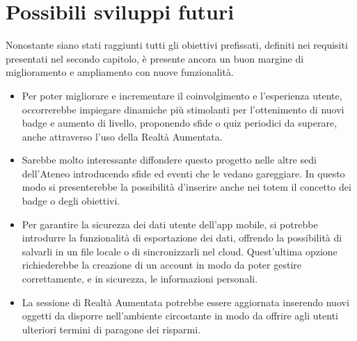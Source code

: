 \section*{Possibili sviluppi futuri}
Nonostante siano stati raggiunti tutti gli obiettivi prefissati, definiti nei requisiti presentati nel secondo capitolo, è presente ancora un buon margine di miglioramento e ampliamento con nuove funzionalità.
\begin{itemize}
    \itemsep1em
    \item Per poter migliorare e incrementare il coinvolgimento e l'esperienza utente, occorrerebbe impiegare dinamiche più stimolanti per l'ottenimento di nuovi badge e aumento di livello, proponendo sfide o quiz periodici da superare, anche attraverso l'uso della Realtà Aumentata.
    \item Sarebbe molto interessante diffondere questo progetto nelle altre sedi dell'Ateneo introducendo sfide ed eventi che le vedano gareggiare. In questo modo si presenterebbe la possibilità d'inserire anche nei totem il concetto dei badge o degli obiettivi.
    \item Per garantire la sicurezza dei dati utente dell'app mobile, si potrebbe introdurre la funzionalità di esportazione dei dati, offrendo la possibilità di salvarli in un file locale o di sincronizzarli nel cloud. Quest'ultima opzione richiederebbe la creazione di un account in modo da poter gestire correttamente, e in sicurezza, le informazioni personali.
    \item La sessione di Realtà Aumentata potrebbe essere aggiornata inserendo nuovi oggetti da disporre nell'ambiente circostante in modo da offrire agli utenti ulteriori termini di paragone dei risparmi.
\end{itemize}
